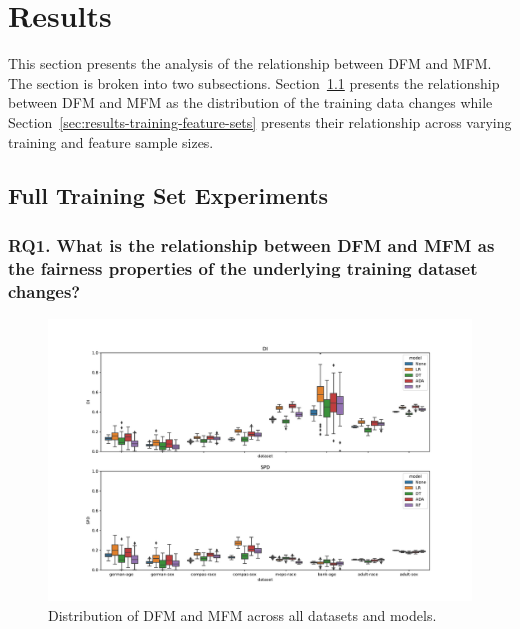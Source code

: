 \documentclass[sigconf,review,anonymous]{acmart}
\begin{document}
\section{Results}\label{sec:results}

This section presents the analysis of the relationship between DFM and
MFM. The section is broken into two
subsections. Section \ref{sec:results-full} presents the relationship
between DFM and MFM as the distribution of the training data changes
while Section \ref{sec:results-training-feature-sets} presents their
relationship across varying training and feature sample sizes.

\subsection{Full Training Set Experiments}\label{sec:results-full}
\subsubsection{RQ1. What is the relationship between DFM and MFM as
the fairness properties of the underlying training dataset changes?}\label{sec:results-full-rel}

\begin{figure}
  \centering
  \includegraphics[width=\linewidth]{boxplot--dataset--di-spd--exp-full.pdf}
  \caption{Distribution of DFM and MFM across all datasets and models.}
  \label{fig:boxplot--dataset--di-spd--exp-full}
\end{figure}
\end{document}
